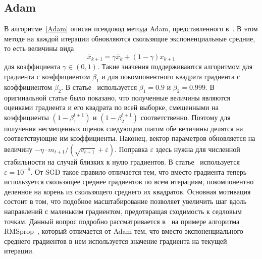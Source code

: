 \documentclass[preprint,12pt]{elsarticle}
\begin{document}
\subsection{Adam}
В алгоритме~\ref{Adam} описан псевдокод метода Adam, представленного в~\cite{adam}. 
В этом методе на каждой итерации обновляются скользящие экспоненциальные средние, то есть величины вида
\[
    \overline{x}_{k+1} = \gamma\overline{x}_k + (1 - \gamma)x_{k+1}
\]
для коэффициента $\gamma \in (0, 1)$. 
Такие значения поддерживаются алгоритмом для градиента с коэффициентом $\beta_1$ и для покомпонентного квадрата градиента с коэффициентом $\beta_2$. 
В статье~\cite{adam} используется $\beta_1 = 0.9$ и $\beta_2 = 0.999$. 
В оригинальной статье было показано, что полученные величины являются оценками градиента и его квадрата по всей выборке, смещенными на коэффициенты $(1 - \beta_1^{t+1})$ и $(1 - \beta_2^{t+1})$ соответственно. 
Поэтому для получения несмещенных оценок следующим шагом обе величины делятся на соответствующие им коэффициенты. 
Наконец, вектор параметров обновляется на величину $-\eta \cdot m_{t+1} / (\sqrt{v_{t+1}} + \varepsilon)$. 
Поправка $\varepsilon$ здесь нужна для численной стабильности на случай близких к нулю градиентов. 
В статье~\cite{adam} используется $\varepsilon = 10^{-8}$.
От SGD такое правило отличается тем, что вместо градиента теперь используется скользящее среднее градиентов по всем итерациям, покомпонентно деленное на корень из скользящего среднего их квадратов. 
Основная мотивация состоит в том, что подобное масштабирование позволяет увеличить шаг вдоль направлений с маленьким градиентом, предотвращая сходимость к седловым точкам. Данный вопрос подробно рассматривается в~\cite{SaddlePoints} на примере алгоритма RMSprop~\cite{RMSprop}, который отличается от Adam тем, что вместо экспоненциального среднего градиентов в нем используется значение градиента на текущей итерации.
\end{document}
